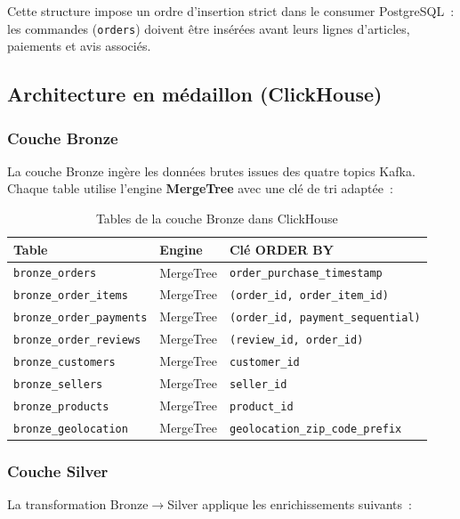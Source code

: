Cette structure impose un ordre d'insertion strict dans le consumer PostgreSQL~: les commandes (\texttt{orders}) doivent être insérées avant leurs lignes d'articles, paiements et avis associés.

\subsection{Architecture en médaillon (ClickHouse)}

\subsubsection{Couche Bronze}

La couche Bronze ingère les données brutes issues des quatre topics Kafka. Chaque table utilise l'engine \textbf{MergeTree} avec une clé de tri adaptée~:

\begin{table}[H]
\centering
\begin{tabular}{p{5cm} p{4cm} p{4.5cm}}
\toprule
\textbf{Table} & \textbf{Engine} & \textbf{Clé ORDER BY} \\
\midrule
\texttt{bronze\_orders} & MergeTree & \texttt{order\_purchase\_timestamp} \\
\texttt{bronze\_order\_items} & MergeTree & \texttt{(order\_id, order\_item\_id)} \\
\texttt{bronze\_order\_payments} & MergeTree & \texttt{(order\_id, payment\_sequential)} \\
\texttt{bronze\_order\_reviews} & MergeTree & \texttt{(review\_id, order\_id)} \\
\texttt{bronze\_customers} & MergeTree & \texttt{customer\_id} \\
\texttt{bronze\_sellers} & MergeTree & \texttt{seller\_id} \\
\texttt{bronze\_products} & MergeTree & \texttt{product\_id} \\
\texttt{bronze\_geolocation} & MergeTree & \texttt{geolocation\_zip\_code\_prefix} \\
\bottomrule
\end{tabular}
\caption{Tables de la couche Bronze dans ClickHouse}
\end{table}

\subsubsection{Couche Silver}

La transformation Bronze$\rightarrow$Silver applique les enrichissements suivants~:

